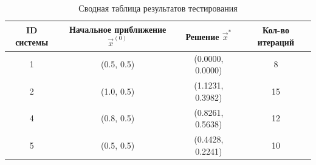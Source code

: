 \begin{table}[h!]
\centering
\begin{tabular}{|c|c|c|c|}
\hline
ID системы & Начальное приближение $\vec{x}^{(0)}$ & Решение $\vec{x}^*$ & Кол-во итераций \\ \hline
1 & (0.5, 0.5) & (0.0000, 0.0000) & 8 \\ \hline
2 & (1.0, 0.5) & (1.1231, 0.3982) & 15 \\ \hline
4 & (0.8, 0.5) & (0.8261, 0.5638) & 12 \\ \hline
5 & (0.5, 0.5) & (0.4428, 0.2241) & 10 \\ \hline
\end{tabular}
\caption{Сводная таблица результатов тестирования}
\end{table}